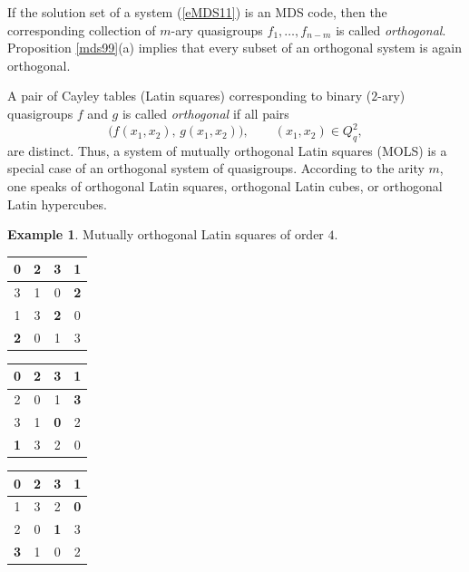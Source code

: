 \documentclass[11pt]{article}
\theoremstyle{definition}
\newtheorem{example}{Example}[section]
\begin{document}
{{{If the solution set of a system  (\ref{eMDS11}) is an MDS
code, then the corresponding collection of $m$-ary quasigroups
$f_1,\dots,f_{n-m}$ is called {\sl orthogonal}. Proposition
\ref{mds99}(a) implies that every subset of an orthogonal system is
again orthogonal.


A pair of Cayley tables (Latin squares) corresponding to binary
($2$-ary) quasigroups $f$ and $g$ is called {\sl orthogonal} if all
pairs
\[
\bigl(f(x_1,x_2),\,g(x_1,x_2)\bigr),
\qquad (x_1,x_2)\in Q_q^2,
\]
are distinct. Thus, a system of mutually orthogonal Latin
squares (MOLS)  is a special case of an orthogonal system of
quasigroups. According to the arity $m$, one speaks of orthogonal
Latin squares, orthogonal Latin cubes, or orthogonal Latin
hypercubes.






\begin{example}
Mutually orthogonal Latin squares of order $4$.

\smallskip

\begin{tabular}{|c|c|c|c|}
 \hline
  0&{\color[rgb]{0.1,1,0.1} \bf 2}&3&1\\
  \hline
  3&1&0&{\color[rgb]{0.1,1,0.1} \bf 2}\\
  \hline
  1&3&{\color[rgb]{0.1,1,0.1} \bf 2}&0\\
  \hline
  {\color[rgb]{0.1,1,0.1} \bf 2}&0&1&3\\
 \hline
 \end{tabular}
\begin{tabular}{|c|c|c|c|}
   \hline
  0&{\color[rgb]{0.1,1,0.1} \bf 2}&3&1\\
   \hline
  2&0&1&{\color[rgb]{0.1,1,0.1} \bf 3}\\
   \hline
  3&1&{\color[rgb]{0.1,1,0.1} \bf 0}&2\\
   \hline
  {\color[rgb]{0.1,1,0.1} \bf 1}&3&2&0\\
 \hline
 \end{tabular}
 \begin{tabular}{|c|c|c|c|}
 \hline
  0&{\color[rgb]{0.1,1,0.1} \bf 2}&3&1\\
   \hline
  1&3&2&{\color[rgb]{0.1,1,0.1} \bf 0}\\
   \hline
  2&0&{\color[rgb]{0.1,1,0.1} \bf 1}&3\\
   \hline
  {\color[rgb]{0.1,1,0.1} \bf 3}&1&0&2\\
 \hline
 \end{tabular}


\end{example}}}}
\end{document}
